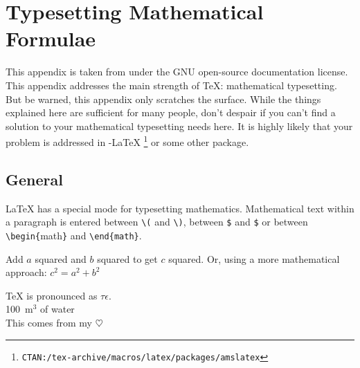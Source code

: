 
\chapter{Typesetting Mathematical Formulae}\label{math}
\begin{intro}
  This appendix is taken from \citet{ophs03} under the GNU open-source documentation license. This appendix addresses the main strength
  of \TeX{}: mathematical typesetting. But be warned, this appendix
  only scratches the surface. While the things explained here are
  sufficient for many people, don't despair if you can't find a
  solution to your mathematical typesetting needs here. It is highly likely
  that your problem is addressed in \AmS-\LaTeX{}%
  \footnote{\texttt{CTAN:/tex-archive/macros/latex/packages/amslatex}}
  or some other package.
\end{intro}
  
\section{General}

\LaTeX{} has a special mode for typesetting mathematics.
Mathematical text within a paragraph is entered between \verb|\(|
and \verb|\)|, %
between \texttt{\$} and \texttt{\$} or between
\verb|\begin{|{math}\verb|}| and \verb|\end{math}|.

\begin{singlespace}
\begin{example}
Add $a$ squared and $b$ squared 
to get $c$ squared. Or, using 
a more mathematical approach:
$c^{2}=a^{2}+b^{2}$
\end{example}
\end{singlespace}

\begin{singlespace}
\begin{example}
\TeX{} is pronounced as 
$\tau\epsilon$.\\[6pt]
100~m$^{3}$ of water\\[6pt]
This comes from my $\heartsuit$
\end{example}
\end{singlespace}

